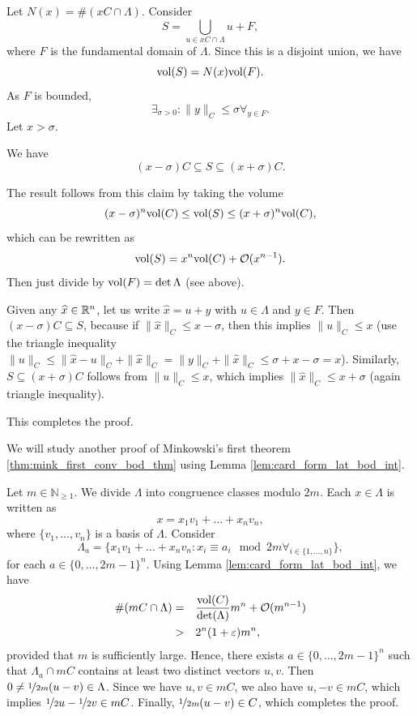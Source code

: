 \documentclass{Vorlesungstemplate_English} %
\renewcommand{\N}{\mathbb{N}_{\geq 1}}
\begin{document}
  \begin{pf}
    Let $N(x) = \#(xC\cap \Lambda)$. Consider
    \[ S = \bigcup_{u \in xC \cap \Lambda} u+F,\]
    where $F$ is the fundamental domain of $\Lambda$.
    Since this is a disjoint union, we have
    \[ \text{vol}(S) = N(x)\text{vol}(F).\]
    As $F$ is bounded,
    \[ \exists_{\sigma > 0}: \|y\|_C \leq \sigma \forall_{y \in F}.\]
    Let $x > \sigma$.
    \begin{claim}{}{}
      We have
      \[ (x-\sigma)C \subseteq S \subseteq (x+\sigma)C.\]
    \end{claim}
    The result follows from this claim by taking the volume
    \[ (x-\sigma)^n\text{vol}(C) \leq \text{vol}(S) \leq (x+\sigma)^n\text{vol}(C),\]
    which can be rewritten as
    \[ \text{vol}(S) = x^n\text{vol}(C)+\mathcal{O}(x^{n-1}).\]
    Then just divide by $\text{vol}(F) = \det\Lambda$ (see above).
    \begin{pf}
      Given any $\widehat{x} \in \mathbb{R}^n$, let us write $\widehat{x} = u + y$ with $u \in \Lambda$ and $y \in F$. Then $(x-\sigma)C \subseteq S$, because if $\|\widehat{x}\|_C \leq x-\sigma$, then this implies $\|u\|_C \leq x$ (use the triangle inequality $\|u\|_C \leq \|\widehat{x}-u\|_C + \|\widehat{x}\|_C = \|y\|_C+\|\widehat{x}\|_C \leq \sigma + x-\sigma = x$). Similarly, $S \subseteq (x+\sigma)C$ follows from $\|u\|_C \leq x$, which implies $\|\widehat{x}\|_C \leq x+\sigma$ (again triangle inequality).
    \end{pf}
    This completes the proof.
  \end{pf}
  We will study another proof of Minkowski's first theorem \ref{thm:mink_first_conv_bod_thm} using Lemma \ref{lem:card_form_lat_bod_int}.
  \begin{pf}
    Let $m \in \N$. We divide $\Lambda$ into congruence classes modulo $2m$. Each $x \in \Lambda$ is written as
    \[ x=x_1v_1 + \dots + x_nv_n,\]
    where $\{ v_1, \dots, v_n\}$ is a basis of $\Lambda$. Consider
    \[ \Lambda_a = \{ x_1v_1 + \dots + x_nv_n: x_i \equiv a_i \mod 2m \forall_{i \in \{ 1, \dots, n\}}\},\]
    for each $a \in \{ 0, \dots, 2m-1\}^n$. Using Lemma \ref{lem:card_form_lat_bod_int}, we have
    \begin{align*}
      \#(mC \cap \Lambda) = \quad & \frac{\text{vol}(C)}{\det(\Lambda)}m^n + \mathcal{O}(m^{n-1}) \\
      > \quad & 2^n(1+\varepsilon)m^n,
    \end{align*}
    provided that $m$ is sufficiently large. Hence, there exists $a \in \{ 0, \dots, 2m-1\}^n$ such that $\Lambda_a \cap mC$ contains at least two distinct vectors $u,v$. Then $0 \neq \nicefrac{1}{2m}(u-v) \in \Lambda$. Since we have $u,v \in mC$, we also have $u,-v \in mC$, which implies $\nicefrac{1}{2}u-\nicefrac{1}{2}v \in mC$. Finally, $\nicefrac{1}{2m}(u-v) \in C$, which completes the proof.
  \end{pf}
\end{document}
